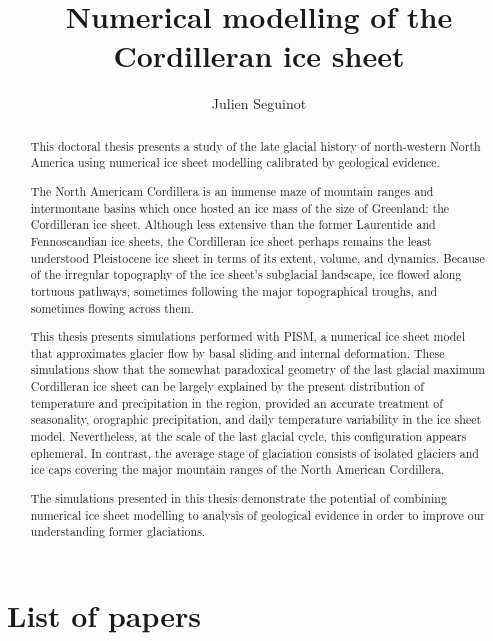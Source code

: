 \documentclass{article}
\title{Numerical modelling of the Cordilleran ice sheet}
\author{Julien Seguinot}
\begin{document}

\maketitle

\begin{abstract}

This doctoral thesis presents a study of the late glacial history of
north-western North America using numerical ice sheet modelling calibrated by
geological evidence.

The North Americam Cordillera is an immense maze of mountain ranges and
intermontane basins which once hosted an ice mass of the size of Greenland: the
Cordilleran ice sheet. Although less extensive than the former Laurentide and
Fennoscandian ice sheets, the Cordilleran ice sheet perhaps remains the least
understood Pleistocene ice sheet in terms of its extent, volume, and dynamics.
Because of the irregular topography of the ice sheet's subglacial landscape,
ice flowed along tortuous pathways, sometimes following the major topographical
troughs, and sometimes flowing across them.

This thesis presents simulations performed with PISM, a numerical ice sheet
model that approximates glacier flow by basal sliding and internal deformation.
These simulations show that the somewhat paradoxical geometry of the last
glacial maximum Cordilleran ice sheet can be largely explained by the present
distribution of temperature and precipitation in the region, provided an
accurate treatment of seasonality, orographic precipitation, and daily
temperature variability in the ice sheet model. Nevertheless, at the scale of
the last glacial cycle, this configuration appears ephemeral. In contrast, the
average stage of glaciation consists of isolated glaciers and ice caps covering
the major mountain ranges of the North American Cordillera.

The simulations presented in this thesis demonstrate the potential of combining
numerical ice sheet modelling to analysis of geological evidence in order to
improve our understanding former glaciations.

\end{abstract}

\newpage

\section*{List of papers}
\end{document}
